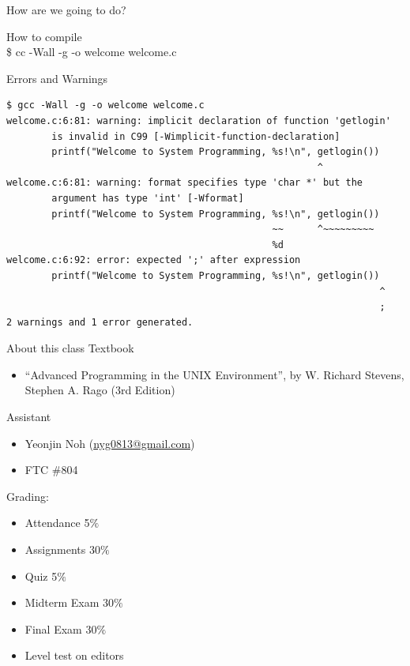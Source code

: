 \documentclass[newPxFont,sthlmFooter,nooffset]{beamer}
\begin{document}
\begin{frame}[t]{How are we going to do?}


How to compile \\
\$ cc -Wall -g -o welcome welcome.c
\end{frame}

\begin{frame}[t,fragile]{Errors and Warnings}
\begin{lstlisting}
$ gcc -Wall -g -o welcome welcome.c
welcome.c:6:81: warning: implicit declaration of function 'getlogin'
        is invalid in C99 [-Wimplicit-function-declaration]
        printf("Welcome to System Programming, %s!\n", getlogin())
                                                       ^
welcome.c:6:81: warning: format specifies type 'char *' but the
        argument has type 'int' [-Wformat]
        printf("Welcome to System Programming, %s!\n", getlogin())
                                               ~~      ^~~~~~~~~~
                                               %d
welcome.c:6:92: error: expected ';' after expression
        printf("Welcome to System Programming, %s!\n", getlogin())
                                                                  ^
                                                                  ;
2 warnings and 1 error generated.
\end{lstlisting}


\end{frame}

\begin{frame}[t]{About this class}
Textbook
\begin{itemize}
	\item ``Advanced Programming in the UNIX Environment'', by
		W. Richard Stevens, Stephen A. Rago (3rd Edition)
\end{itemize}
\bigskip
Assistant
\begin{itemize}
	\item Yeonjin Noh (\href{mailto:nyg0813@gmail.com }{nyg0813@gmail.com})
	\item FTC \#804
\end{itemize}
\bigskip


\bigskip
Grading:
\vspace{-1em}
\begin{multicols}{2}
\begin{itemize}
	\item Attendance 5$\%$
	\item Assignments 30$\%$
	\item Quiz 5$\%$
	\item Midterm Exam 30$\%$
	\item Final Exam 30$\%$
	\item Level test on editors
\end{itemize}
\end{multicols}
\end{frame}
\end{document}
